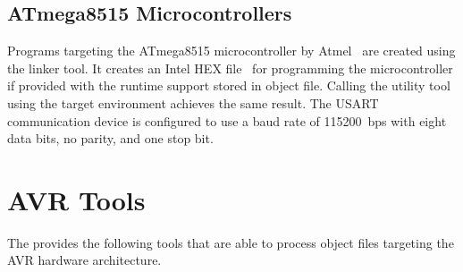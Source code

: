 \subsection{ATmega8515 Microcontrollers}

Programs targeting the ATmega8515 microcontroller by Atmel~\cite{atmega8515} are created using the  linker tool.
It creates an Intel HEX file~\cite{hexfile} for programming the microcontroller if provided with the runtime support stored in  object file.
Calling the  utility tool using the  target environment achieves the same result.
The USART communication device is configured to use a baud rate of 115200~bps with eight data bits, no parity, and one stop bit.

\section{AVR Tools}

The \ecs{} provides the following tools that are able to process object files targeting the AVR hardware architecture.
\interface

\cdavr
\cppavr
\falavr
\obavr
\avrasm
\avrdism
\linkhex

\concludechapter
